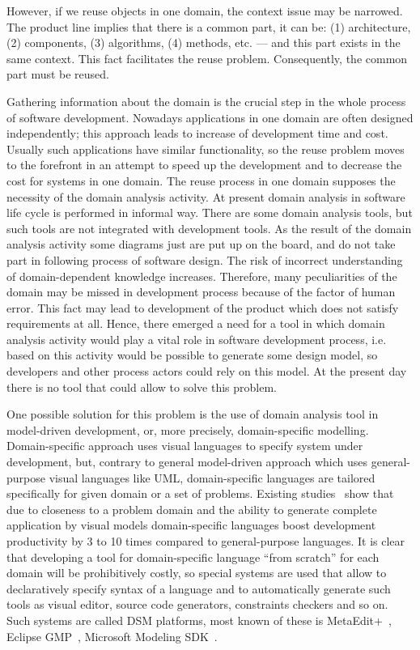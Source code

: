 \documentclass[conference]{IEEEtran}
\begin{document}
However, if we reuse objects in one domain, the context issue may be narrowed. The product line implies that there is a common part, it can be: (1) architecture, (2) components, (3) algorithms, (4) methods, etc. --- and this part exists in the same context. This fact facilitates the reuse problem. Consequently, the common part must be reused.

Gathering information about the domain is the crucial step in the whole process of software development. Nowadays applications in one domain are often designed independently; this approach leads to increase of development time and cost. Usually such applications have similar functionality, so the reuse problem moves to the forefront in an attempt to speed up the development and to decrease the cost for systems in one domain. The reuse process in one domain supposes the necessity of the domain analysis activity. At present domain analysis in software life cycle is performed in informal way. There are some domain analysis tools, but such tools are not integrated with development tools. As the result of the domain analysis activity some diagrams just are put up on the board, and do not take part in following process of software design. The risk of incorrect understanding of domain-dependent knowledge increases. Therefore, many peculiarities of the domain may be missed in development process because of the factor of human error. This fact may lead to development of the product which does not satisfy requirements at all. Hence, there emerged a need for a tool in which domain analysis activity would play a vital role in software development process, i.e. based on this activity would be possible to generate some design model, so developers and other process actors could rely on this model. At the present day there is no tool that could allow to solve this problem.   

One possible solution for this problem is the use of domain analysis tool in model-driven development, or, more precisely, domain-specific modelling. Domain-specific approach uses visual languages to specify system under development, but, contrary to general model-driven approach which uses general-purpose visual languages like UML, domain-specific languages are tailored specifically for given domain or a set of problems. Existing studies~\cite{tolvanen2016challenges,baker2005model,kieburtz1996software,kelly2000visual} show that due to closeness to a problem domain and the ability to generate complete application by visual models domain-specific languages boost development productivity by 3 to 10 times compared to general-purpose languages. It is clear that developing a tool for domain-specific language ``from scratch'' for each domain will be prohibitively costly, so special systems are used that allow to declaratively specify syntax of a language and to automatically generate such tools as visual editor, source code generators, constraints checkers and so on. Such systems are called DSM platforms, most known of these is MetaEdit+~\cite{tolvanen2007advanced,tolvanen2009metaedit,kelly2008domain}, Eclipse GMP~\cite{gronback2009eclipse,viyovic2014sirius}, Microsoft Modeling SDK~\cite{cook2007domain}.
\end{document}
